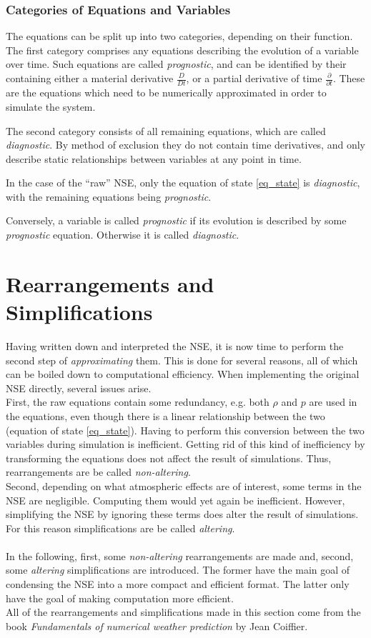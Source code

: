 \subsubsection{Categories of Equations and Variables}
The equations can be split up into two categories, depending on their function.
The first category comprises any equations describing the evolution of a variable over time.
Such equations are called \emph{prognostic}, and can be identified by their containing either a material derivative $\frac{D}{Dt}$, or a partial derivative of time $\frac{\partial}{\partial t}$.
These are the equations which need to be numerically approximated in order to simulate the system.

The second category consists of all remaining equations, which are called \emph{diagnostic}.
By method of exclusion they do not contain time derivatives, and only describe static relationships between variables at any point in time.

In the case of the ``raw'' NSE, only the equation of state \ref{eq_state} is \emph{diagnostic}, with the remaining equations being \emph{prognostic}.

Conversely, a variable is called \emph{prognostic} if its evolution is described by some \emph{prognostic} equation.
Otherwise it is called \emph{diagnostic}.

\section{Rearrangements and Simplifications}
Having written down and interpreted the NSE, it is now time to perform the second step of \emph{approximating} them.
This is done for several reasons, all of which can be boiled down to computational efficiency.
When implementing the original NSE directly, several issues arise.
\\
First, the raw equations contain some redundancy, e.g. both $\rho$ and $p$ are used in the equations, even though there is a linear relationship between the two (equation of state \ref{eq_state}).
Having to perform this conversion between the two variables during simulation is inefficient.
Getting rid of this kind of inefficiency by transforming the equations does not affect the result of simulations.
Thus, rearrangements are be called \emph{non-altering}.
\\
Second, depending on what atmospheric effects are of interest, some terms in the NSE are negligible.
Computing them would yet again be inefficient.
However, simplifying the NSE by ignoring these terms does alter the result of simulations.
For this reason simplifications are be called \emph{altering}.
\\
\\
In the following, first, some \emph{non-altering} rearrangements are made and, second, some \emph{altering} simplifications are introduced.
The former have the main goal of condensing the NSE into a more compact and efficient format.
The latter only have the goal of making computation more efficient.\\
All of the rearrangements and simplifications made in this section come from the book \emph{Fundamentals of numerical weather prediction} by Jean Coiffier\cite{coiffier2011fundamentals}.

